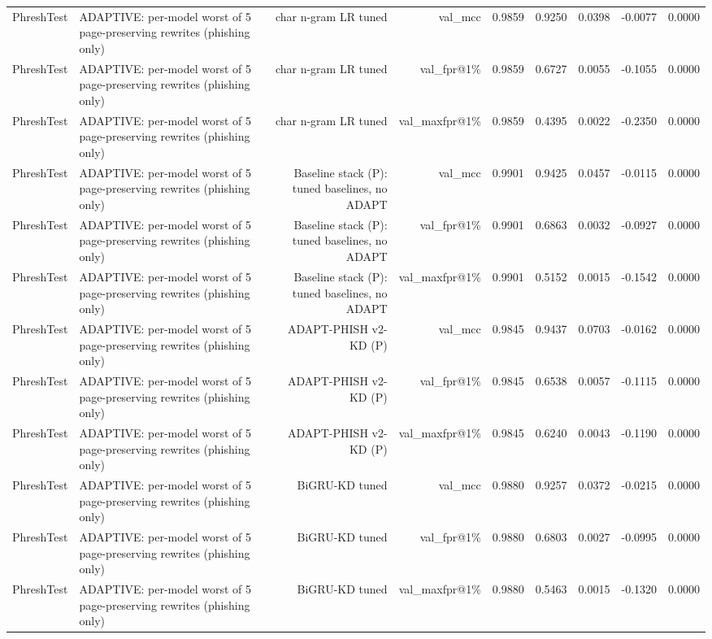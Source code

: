 \begin{table}[t]
\begin{tabular}{llrrrrrrr}
PhreshTest & ADAPTIVE: per-model worst of 5 page-preserving rewrites (phishing only) & char n-gram LR tuned & val\_mcc & 0.9859 & 0.9250 & 0.0398 & -0.0077 & 0.0000 \\
PhreshTest & ADAPTIVE: per-model worst of 5 page-preserving rewrites (phishing only) & char n-gram LR tuned & val\_fpr@1\% & 0.9859 & 0.6727 & 0.0055 & -0.1055 & 0.0000 \\
PhreshTest & ADAPTIVE: per-model worst of 5 page-preserving rewrites (phishing only) & char n-gram LR tuned & val\_maxfpr@1\% & 0.9859 & 0.4395 & 0.0022 & -0.2350 & 0.0000 \\
PhreshTest & ADAPTIVE: per-model worst of 5 page-preserving rewrites (phishing only) & Baseline stack (P): tuned baselines, no ADAPT & val\_mcc & 0.9901 & 0.9425 & 0.0457 & -0.0115 & 0.0000 \\
PhreshTest & ADAPTIVE: per-model worst of 5 page-preserving rewrites (phishing only) & Baseline stack (P): tuned baselines, no ADAPT & val\_fpr@1\% & 0.9901 & 0.6863 & 0.0032 & -0.0927 & 0.0000 \\
PhreshTest & ADAPTIVE: per-model worst of 5 page-preserving rewrites (phishing only) & Baseline stack (P): tuned baselines, no ADAPT & val\_maxfpr@1\% & 0.9901 & 0.5152 & 0.0015 & -0.1542 & 0.0000 \\
PhreshTest & ADAPTIVE: per-model worst of 5 page-preserving rewrites (phishing only) & ADAPT-PHISH v2-KD (P) & val\_mcc & 0.9845 & 0.9437 & 0.0703 & -0.0162 & 0.0000 \\
PhreshTest & ADAPTIVE: per-model worst of 5 page-preserving rewrites (phishing only) & ADAPT-PHISH v2-KD (P) & val\_fpr@1\% & 0.9845 & 0.6538 & 0.0057 & -0.1115 & 0.0000 \\
PhreshTest & ADAPTIVE: per-model worst of 5 page-preserving rewrites (phishing only) & ADAPT-PHISH v2-KD (P) & val\_maxfpr@1\% & 0.9845 & 0.6240 & 0.0043 & -0.1190 & 0.0000 \\
PhreshTest & ADAPTIVE: per-model worst of 5 page-preserving rewrites (phishing only) & BiGRU-KD tuned & val\_mcc & 0.9880 & 0.9257 & 0.0372 & -0.0215 & 0.0000 \\
PhreshTest & ADAPTIVE: per-model worst of 5 page-preserving rewrites (phishing only) & BiGRU-KD tuned & val\_fpr@1\% & 0.9880 & 0.6803 & 0.0027 & -0.0995 & 0.0000 \\
PhreshTest & ADAPTIVE: per-model worst of 5 page-preserving rewrites (phishing only) & BiGRU-KD tuned & val\_maxfpr@1\% & 0.9880 & 0.5463 & 0.0015 & -0.1320 & 0.0000 \\

\end{tabular}
\end{table}
